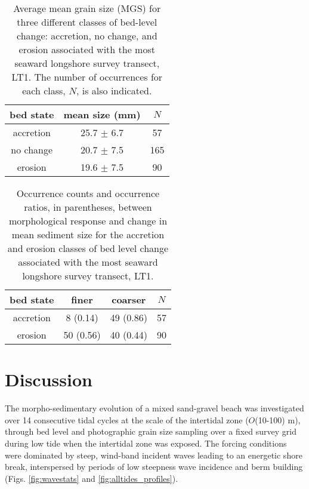 \documentclass[preprint,12pt,authoryear]{elsarticle}
\begin{document}
\begin{table}[tbp!]
	\caption[Mean grain size correspoonding to bed accretion, no change, and erosion]{Average mean grain size (MGS) for three different classes of bed-level change: accretion, no change, and erosion associated with the most seaward longshore survey transect, LT1. The number of occurrences for each class, $N$, is also indicated.} 
	\label{table:dz_mgs}
	\centering
	\begin{tabular}{ccc}
		\hline
		bed state & mean size (mm) & $N$\\
		\hline
		accretion & 25.7 $\pm$ 6.7 & 57\\
		no change & 20.7 $\pm$ 7.5 & 165\\
		erosion   & 19.6 $\pm$ 7.5 & 90\\
		\hline
	\end{tabular}
\end{table}

\begin{table}[tbp!]
	\caption[Occurrence counts of bed fining and coarsening during bed accretion and erosion]{Occurrence counts and occurrence ratios, in parentheses, between morphological response and change in mean sediment size for the accretion and erosion classes of bed level change associated with the most seaward longshore survey transect, LT1.} 
	\label{table:dz_dmgs}
	\centering
	\begin{tabular}{cccc}
		\hline
		bed state & finer & coarser & $N$\\
		\hline
		accretion & 8 (0.14) & 49 (0.86) & 57\\
		erosion & 50 (0.56) & 40 (0.44) & 90\\
		\hline
	\end{tabular}
\end{table}


\section{Discussion}\label{Discussion}

The morpho-sedimentary evolution of a mixed sand-gravel beach was investigated over 14 consecutive tidal cycles at the scale of the intertidal zone ($O$(10-100) m), through bed level and photographic grain size sampling over a fixed survey grid during low tide when the intertidal zone was exposed. The forcing conditions were dominated by steep, wind-band incident waves leading to an energetic shore break, interspersed by periods of low steepness wave incidence and berm building (Figs. \ref{fig:wavestats} and \ref{fig:alltides_profiles}). 
\end{document}
